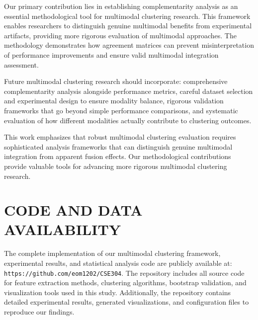 \documentclass[sigconf]{acmart}
\begin{document}
Our primary contribution lies in establishing complementarity analysis as an essential methodological tool for multimodal clustering research. This framework enables researchers to distinguish genuine multimodal benefits from experimental artifacts, providing more rigorous evaluation of multimodal approaches. The methodology demonstrates how agreement matrices can prevent misinterpretation of performance improvements and ensure valid multimodal integration assessment.

Future multimodal clustering research should incorporate: comprehensive complementarity analysis alongside performance metrics, careful dataset selection and experimental design to ensure modality balance, rigorous validation frameworks that go beyond simple performance comparisons, and systematic evaluation of how different modalities actually contribute to clustering outcomes.

This work emphasizes that robust multimodal clustering evaluation requires sophisticated analysis frameworks that can distinguish genuine multimodal integration from apparent fusion effects. Our methodological contributions provide valuable tools for advancing more rigorous multimodal clustering research.

\section{CODE AND DATA AVAILABILITY}

The complete implementation of our multimodal clustering framework, experimental results, and statistical analysis code are publicly available at: \texttt{https://github.com/eom1202/CSE304}. The repository includes all source code for feature extraction methods, clustering algorithms, bootstrap validation, and visualization tools used in this study. Additionally, the repository contains detailed experimental results, generated visualizations, and configuration files to reproduce our findings.



\end{document}
